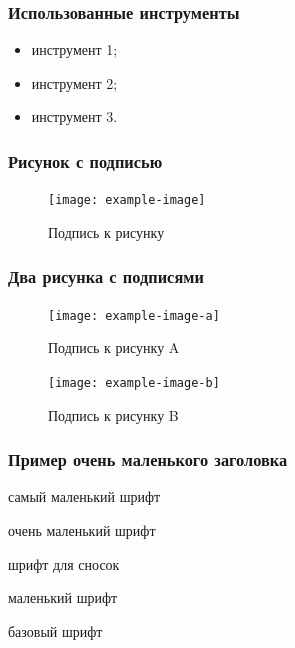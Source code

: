 \documentclass{beamer}
\begin{document}
{%
\begin{frame}
    \frametitle{Использованные инструменты}
    \begin{itemize}
        \item инструмент 1;
        \item инструмент 2;
        \item инструмент 3.
    \end{itemize}
\end{frame}


\begin{frame}
    \frametitle{Рисунок с подписью}
    \vspace{15mm} %
    \begin{figure}
        \texttt{[image: example-image]}
        \caption{Подпись к рисунку}
    \end{figure}
\end{frame}


\begin{frame}
    \frametitle{Два рисунка с подписями}
    \vspace{15mm} %
    \begin{figure}
        \centering
        \begin{minipage}[b]{0.45\textwidth}
            \texttt{[image: example-image-a]}
            \caption{Подпись к рисунку A}
        \end{minipage}
        \hfill
        \begin{minipage}[b]{0.45\textwidth}
            \texttt{[image: example-image-b]}
            \caption{Подпись к рисунку B}
        \end{minipage}
    \end{figure}
\end{frame}


\begin{frame}
    \frametitle{\scriptsize Пример очень маленького заголовка}
    \vspace{5mm}
    
    \tiny самый маленький шрифт
    
    \scriptsize очень маленький шрифт
    
    \footnotesize шрифт для сносок
    
    \small маленький шрифт
    
    \normalsize базовый шрифт
    

\end{frame}}
\end{document}
